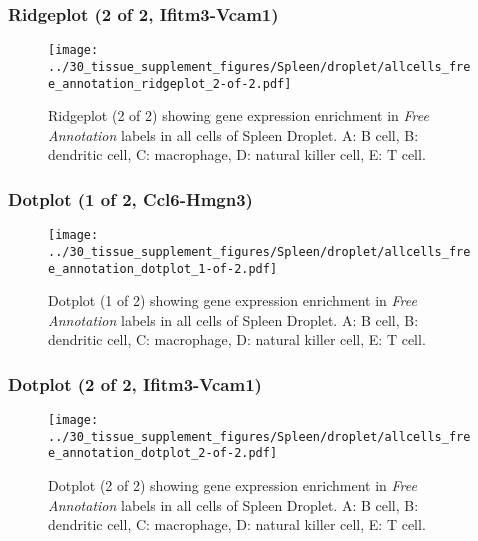 \clearpage

\subsubsection{Ridgeplot (2 of 2, Ifitm3-Vcam1)}
\begin{figure}[h]
\centering
\texttt{[image: ../30\_tissue\_supplement\_figures/Spleen/droplet/allcells\_free\_annotation\_ridgeplot\_2-of-2.pdf]}

\caption{ Ridgeplot (2 of 2)  showing gene expression enrichment in \emph{Free Annotation} labels in all cells of Spleen Droplet. A: B cell, B: dendritic cell, C: macrophage, D: natural killer cell, E: T cell.}
\end{figure}


\clearpage

\subsubsection{Dotplot (1 of 2, Ccl6-Hmgn3)}
\begin{figure}[h]
\centering
\texttt{[image: ../30\_tissue\_supplement\_figures/Spleen/droplet/allcells\_free\_annotation\_dotplot\_1-of-2.pdf]}

\caption{ Dotplot (1 of 2)  showing gene expression enrichment in \emph{Free Annotation} labels in all cells of Spleen Droplet. A: B cell, B: dendritic cell, C: macrophage, D: natural killer cell, E: T cell.}
\end{figure}


\clearpage

\subsubsection{Dotplot (2 of 2, Ifitm3-Vcam1)}
\begin{figure}[h]
\centering
\texttt{[image: ../30\_tissue\_supplement\_figures/Spleen/droplet/allcells\_free\_annotation\_dotplot\_2-of-2.pdf]}

\caption{ Dotplot (2 of 2)  showing gene expression enrichment in \emph{Free Annotation} labels in all cells of Spleen Droplet. A: B cell, B: dendritic cell, C: macrophage, D: natural killer cell, E: T cell.}
\end{figure}

